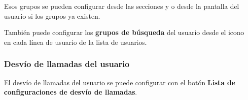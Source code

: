 \documentclass[letterpaper,10pt,spanish]{sphinxmanual}
\begin{document}
Esos grupos se pueden configurar desde las secciones {\hyperref[administration_portal/client/vpbx/routing_endpoints/hunt_groups:huntgroups]{}} y {\hyperref[administration_portal/client/vpbx/user_configuration/pick_up_groups:capture\string-groups]{}} o desde la pantalla del usuario si los grupos ya existen.

También puede configurar los \textbf{grupos de búsqueda} del usuario desde el icono en cada línea de usuario de la lista de usuarios.


\subsubsection{Desvío de llamadas del usuario}
\label{administration_portal/client/vpbx/users:user-call-forward}
El desvío de llamadas del usuario se puede configurar con el botón \textbf{Lista de configuraciones de desvío de llamadas}.
\end{document}
